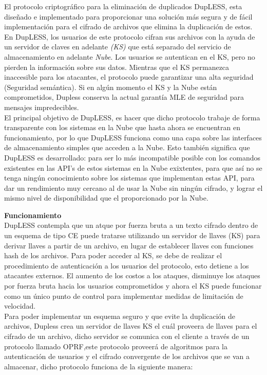 El protocolo criptográfico para la eliminación de duplicados DupLESS, esta diseñado e implementado para proporcionar una solución más segura y de fácil implementación para el cifrado de archivos que elimina la duplicación de estos. En DupLESS, los usuarios de este protocolo cifran sus archivos con la ayuda de un servidor de claves en adelante \textit{(KS)} que está separado del servicio de almacenamiento en adelante  \textit{Nube}. Los usuarios se autentican en el KS, pero no pierden la información sobre sus datos. Mientras que el KS permanezca inaccesible para los atacantes, el protocolo puede garantizar una alta seguridad (Seguridad semántica). Si en algún momento el KS y la Nube están comprometidos, Dupless conserva la actual garantía MLE de seguridad para mensajes impredecibles.\\ 

El principal objetivo de DupLESS, es hacer que dicho protocolo trabaje de forma transparente con los sistemas en la Nube que hasta ahora se encuentran en funcionamiento, por lo que DupLESS funciona como una capa sobre las interfaces de almacenamiento simples que acceden a la Nube. Esto también significa que DupLESS es desarrollado: para ser lo más incompatible posible con los comandos existentes en las API's de estos sistemas en la Nube exixtentes, para que así no se tenga ningún conocimiento sobre los sistemas que implementan estas API, para dar un rendimiento muy cercano al de usar la Nube sin ningún cifrado, y lograr el mismo nivel de disponibilidad que el proporcionado por la Nube.


\textbf{Funcionamiento}\\

DupLESS contempla que un atque por fuerza bruta a un texto cifrado dentro de un esquema de tipo CE puede tratarse utilizando un servidor de llaves (KS) para derivar llaves a partir de un archivo, en lugar de establecer llaves con funciones hash de los archivos. Para poder acceder al KS, se debe de realizar el procedimiento de autenticación a los usuarios del protocolo, esto detiene a los atacantes externos. El aumento de los costos a los ataques, disminuye los ataques por fuerza bruta hacia los usuarios comprometidos y ahora el KS puede funcionar como un único punto de control para implementar medidas de limitación de velocidad. \\

Para poder implementar un esquema seguro y que evite la duplicación de archivos, Dupless crea un servidor de llaves KS el cuál proveera de llaves para el cifrado de un archivo, dicho servidor se comunica con el cliente a través de un protocolo llamado OPRF,este protocolo proveerá de algoritmos para la autenticación de usuarios y el cifrado convergente de los archivos que se van a almacenar, dicho protocolo funciona de la siguiente manera: \\ 

